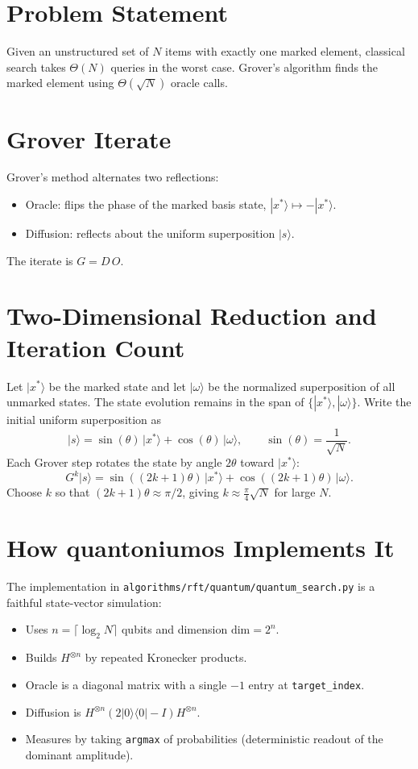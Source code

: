 \documentclass[11pt, a4paper, openany]{book}
\theoremstyle{definition}
\begin{document}
\section{Problem Statement}
Given an unstructured set of $N$ items with exactly one marked element, classical search takes $\Theta(N)$ queries in the worst case. Grover's algorithm finds the marked element using $\Theta(\sqrt{N})$ oracle calls.

\section{Grover Iterate}
Grover's method alternates two reflections:
\begin{itemize}
    \item Oracle: flips the phase of the marked basis state, $|x^*\rangle \mapsto -|x^*\rangle$.
    \item Diffusion: reflects about the uniform superposition $|s\rangle$.
\end{itemize}
The iterate is $G = D\,O$.

\section{Two-Dimensional Reduction and Iteration Count}
Let $|x^*\rangle$ be the marked state and let $|\omega\rangle$ be the normalized superposition of all unmarked states. The state evolution remains in the span of $\{|x^*\rangle, |\omega\rangle\}$.
Write the initial uniform superposition as
\begin{equation}
|s\rangle = \sin(\theta)\,|x^*\rangle + \cos(\theta)\,|\omega\rangle,\qquad \sin(\theta)=\frac{1}{\sqrt{N}}.
\end{equation}
Each Grover step rotates the state by angle $2\theta$ toward $|x^*\rangle$:
\begin{equation}
G^k|s\rangle = \sin((2k+1)\theta)\,|x^*\rangle + \cos((2k+1)\theta)\,|\omega\rangle.
\end{equation}
Choose $k$ so that $(2k+1)\theta\approx \pi/2$, giving $k\approx \frac{\pi}{4}\sqrt{N}$ for large $N$.

\section{How quantoniumos Implements It}
The implementation in \texttt{algorithms/rft/quantum/quantum\_search.py} is a faithful state-vector simulation:
\begin{itemize}
    \item Uses $n=\lceil\log_2 N\rceil$ qubits and dimension $\mathrm{dim}=2^n$.
    \item Builds $H^{\otimes n}$ by repeated Kronecker products.
    \item Oracle is a diagonal matrix with a single $-1$ entry at \texttt{target\_index}.
    \item Diffusion is $H^{\otimes n}(2|0\rangle\langle 0|-I)H^{\otimes n}$.
    \item Measures by taking \texttt{argmax} of probabilities (deterministic readout of the dominant amplitude).
\end{itemize}
\end{document}
